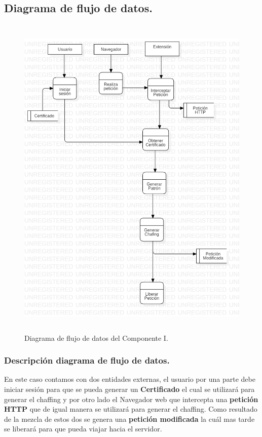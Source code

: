 \documentclass[12pt, a4paper, titlepage]{report}
\begin{document}
			\subsection{Diagrama de flujo de datos.}
			    \begin{figure}[H]
					\begin{center}			        	    \includegraphics[height=16cm]{./imagenes/Disenio/Componente_1/CI_DFD.png}
						\caption{Diagrama de flujo de datos del Componente I.}
					\end{center}
				\end{figure}
			    
			    \subsubsection{Descripción diagrama de flujo de datos.}
			        En este caso contamos con dos entidades externas, el usuario por una parte debe iniciar sesión para que se pueda generar un \textbf{Certificado} el cual se utilizará para generar el chaffing y por otro lado el Navegador web que intercepta una \textbf{petición HTTP} que de igual manera se utilizará para generar el chaffing. Como resultado de la mezcla de estos dos se genera una \textbf{petición modificada} la cuál mas tarde se liberará para que pueda viajar hacia el servidor.
			   
\end{document}
